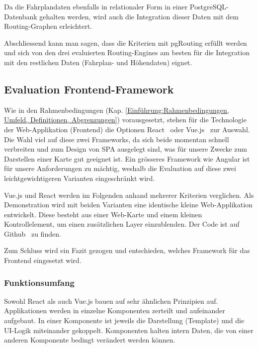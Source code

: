 Da die Fahrplandaten ebenfalls in relationaler Form in einer PostgreSQL-Datenbank gehalten werden, wird auch die Integration dieser Daten mit dem Routing-Graphen erleichtert.

Abschliessend kann man sagen, dass die Kriterien mit pgRouting erfüllt werden und sich von den drei evaluierten Routing-Engines am besten für die Integration mit den restlichen Daten (Fahrplan- und Höhendaten) eignet.

\subsection{Evaluation Frontend-Framework}
\label{Analyse:Evaluation Frontend-Framework}

Wie in den Rahmenbedingungen (Kap. \ref{Einführung:Rahmenbedingungen, Umfeld, Definitionen, Abgrenzungen}) vorausgesetzt, stehen für die Technologie der Web-Applikation (Frontend) die Optionen React~\cite{react} oder Vue.js~\cite{vuejs} zur Auswahl.
Die Wahl viel auf diese zwei Frameworks, da sich beide momentan schnell verbreiten und zum Design von \ac{SPA} ausgelegt sind, was für unsere Zwecke zum Darstellen einer Karte gut geeignet ist.
Ein grösseres Framework wie Angular ist für unsere Anforderungen zu mächtig, weshalb die Evaluation auf diese zwei leichtgewichtigeren Varianten eingeschränkt wird.

Vue.js und React werden im Folgenden anhand mehrerer Kriterien verglichen.
Als Demonstration wird mit beiden Varianten eine identische kleine Web-Applikation entwickelt.
Diese besteht aus einer Web-Karte und einem kleinen Kontrollelement, um einen zusätzlichen Layer einzublenden.
Der Code ist auf Github~\cite{github:playground} zu finden.

Zum Schluss wird ein Fazit gezogen und entschieden, welches Framework für das Frontend eingesetzt wird.

\subsubsection{Funktionsumfang}
\label{Analyse Framework:Funktionsumfang}

Sowohl React als auch Vue.js bauen auf sehr ähnlichen Prinzipien auf.
Applikationen werden in einzelne Komponenten zerteilt und aufeinander aufgebaut.
In einer Komponente ist jeweils die Darstellung (Template) und die UI-Logik miteinander gekoppelt.
Komponenten halten intern Daten, die von einer anderen Komponente bedingt verändert werden können.

